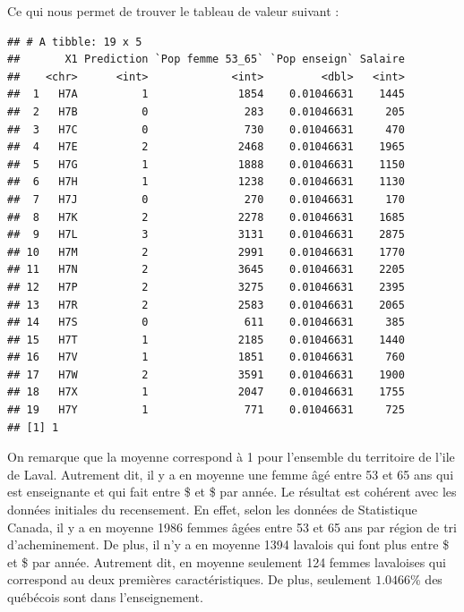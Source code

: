 \documentclass[11pt,french]{report}\usepackage[]{graphicx}\usepackage[]{color}
\makeatletter
\newenvironment{kframe}{%
 \def\at@end@of@kframe{}%
 \ifinner\ifhmode%
  \def\at@end@of@kframe{\end{minipage}}%
  \begin{minipage}{\columnwidth}%
 \fi\fi%
 \def\FrameCommand##1{\hskip\@totalleftmargin \hskip-\fboxsep
 \colorbox{shadecolor}{##1}\hskip-\fboxsep
     \hskip-\linewidth \hskip-\@totalleftmargin \hskip\columnwidth}%
 \MakeFramed {\advance\hsize-\width
   \@totalleftmargin\z@ \linewidth\hsize
   \@setminipage}}%
 {\par\unskip\endMakeFramed%
 \at@end@of@kframe}
\newenvironment{knitrout}{}{} %
\makeatother
\begin{document}
Ce qui nous permet de trouver le tableau de valeur suivant :
\begin{knitrout}
\color{fgcolor}\begin{kframe}
\begin{verbatim}
## # A tibble: 19 x 5
##       X1 Prediction `Pop femme 53_65` `Pop enseign` Salaire
##    <chr>      <int>             <int>         <dbl>   <int>
##  1   H7A          1              1854    0.01046631    1445
##  2   H7B          0               283    0.01046631     205
##  3   H7C          0               730    0.01046631     470
##  4   H7E          2              2468    0.01046631    1965
##  5   H7G          1              1888    0.01046631    1150
##  6   H7H          1              1238    0.01046631    1130
##  7   H7J          0               270    0.01046631     170
##  8   H7K          2              2278    0.01046631    1685
##  9   H7L          3              3131    0.01046631    2875
## 10   H7M          2              2991    0.01046631    1770
## 11   H7N          2              3645    0.01046631    2205
## 12   H7P          2              3275    0.01046631    2395
## 13   H7R          2              2583    0.01046631    2065
## 14   H7S          0               611    0.01046631     385
## 15   H7T          1              2185    0.01046631    1440
## 16   H7V          1              1851    0.01046631     760
## 17   H7W          2              3591    0.01046631    1900
## 18   H7X          1              2047    0.01046631    1755
## 19   H7Y          1               771    0.01046631     725
## [1] 1
\end{verbatim}
\end{kframe}
\end{knitrout}
On remarque que la moyenne correspond à 1 pour l'ensemble du territoire de l'ile de Laval. Autrement dit, il y a en moyenne une femme âgé entre 53 et 65 ans qui est enseignante et qui fait entre \$ et  \$  par année. Le résultat est cohérent avec les données initiales du recensement. En effet, selon les données de Statistique Canada, il y a en moyenne 1986 femmes âgées entre 53 et 65 ans par région de tri d'acheminement. De plus, il n'y a en moyenne 1394 lavalois qui font plus entre  \$ et  \$  par année. Autrement dit, en moyenne seulement 124 femmes lavaloises qui correspond au deux premières caractéristiques. De plus, seulement $1.0466$\% des québécois sont dans l'enseignement. 
\end{document}
